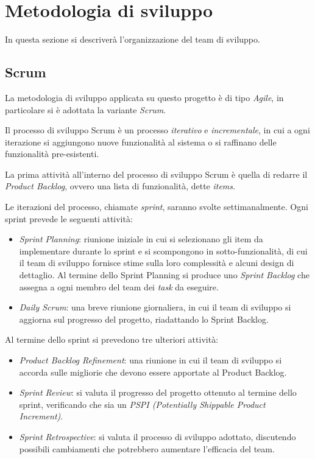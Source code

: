 \section{Metodologia di sviluppo}
In questa sezione si descriverà l'organizzazione del team di sviluppo.

\subsection{Scrum}
La metodologia di sviluppo applicata su questo progetto è di tipo \textit{Agile}, in particolare
si è adottata la variante \textit{Scrum}.

Il processo di sviluppo Scrum è un processo \textit{iterativo} e \textit{incrementale}, in cui a ogni
iterazione si aggiungono nuove funzionalità al sistema o si raffinano delle funzionalità
pre-esistenti.

La prima attività all'interno del processo di sviluppo Scrum è quella di redarre il
\textit{Product Backlog}, ovvero una lista di funzionalità, dette \textit{items}.

Le iterazioni del processo, chiamate \textit{sprint}, saranno svolte settimanalmente. Ogni sprint
prevede le seguenti attività:
\begin{itemize}
    \item \textit{Sprint Planning}: riunione iniziale in cui si selezionano gli item da implementare
    durante lo sprint e si scompongono in sotto-funzionalità, di cui il team di sviluppo
    fornisce stime sulla loro complessità e alcuni design di dettaglio. Al termine dello
    Sprint Planning si produce uno \textit{Sprint Backlog} che assegna a ogni membro del team
    dei \textit{task} da eseguire.
    \item \textit{Daily Scrum}: una breve riunione giornaliera, in cui il team di sviluppo si aggiorna
    sul progresso del progetto, riadattando lo Sprint Backlog.
\end{itemize}

Al termine dello sprint si prevedono tre ulteriori attività:
\begin{itemize}
    \item \textit{Product Backlog Refinement}: una riunione in cui il team di sviluppo si accorda sulle
    migliorie che devono essere apportate al Product Backlog.
    \item \textit{Sprint Review}: si valuta il progresso del progetto ottenuto al termine dello sprint,
    verificando che sia un \textit{PSPI (Potentially Shippable Product Increment)}.
    \item \textit{Sprint Retrospective}: si valuta il processo di sviluppo adottato, discutendo possibili
    cambiamenti che potrebbero aumentare l'efficacia del team.
\end{itemize}

